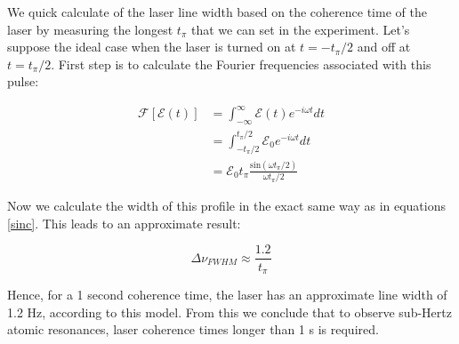 We quick calculate of the laser line width based on the coherence time of the laser by measuring the longest $t_\pi$ that we can set in the experiment. Let's suppose the ideal case when the laser is turned on at $t=-t_{\pi}/2$ and off at $t=t_{\pi}/2$. First step is to calculate the Fourier frequencies associated with this pulse:

\begin{equation}
    \begin{split}
        \mathcal{F}[\mathcal{E}(t)] & = \int^{\infty}_{-\infty} \mathcal{E}(t) e^{-i\omega t} dt \\
        & = \int^{t_{\pi}/2}_{-t_{\pi}/2} \mathcal{E}_{0} e^{-i\omega t} dt \\
        & = \mathcal{E}_{0} t_{\pi} \frac{\textrm{sin} (\omega t_{\pi}/2)} {\omega t_{\pi}/2}
    \end{split}
\end{equation}

Now we calculate the width of this profile in the exact same way as in equations \ref{sinc}. This leads to an approximate result:

\begin{equation}
    \Delta \nu _{FWHM} \approx \frac{1.2}{t_{\pi}}
\end{equation}

Hence, for a 1 second coherence time, the laser has an approximate line width of 1.2 Hz, according to this model. From this we conclude that to observe sub-Hertz atomic resonances, laser coherence times longer than 1 s is required.